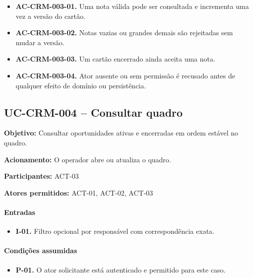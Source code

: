 \documentclass[10pt,a4paper]{article}
\begin{document}
\begin{itemize}

\item \textbf{AC-CRM-003-01.} Uma nota válida pode ser consultada e incrementa uma vez a versão do cartão.

\item \textbf{AC-CRM-003-02.} Notas vazias ou grandes demais são rejeitadas sem mudar a versão.

\item \textbf{AC-CRM-003-03.} Um cartão encerrado ainda aceita uma nota.

\item \textbf{AC-CRM-003-04.} Ator ausente ou sem permissão é recusado antes de qualquer efeito de domínio ou persistência.

\end{itemize}

\subsection{UC-CRM-004 -- Consultar quadro}

\textbf{Objetivo:} Consultar oportunidades ativas e encerradas em ordem estável no quadro.

\textbf{Acionamento:} O operador abre ou atualiza o quadro.

\textbf{Participantes:} ACT-03

\textbf{Atores permitidos:} ACT-01, ACT-02, ACT-03

\paragraph{Entradas}

\begin{itemize}

\item \textbf{I-01.} Filtro opcional por responsável com correspondência exata.

\end{itemize}

\paragraph{Condições assumidas}

\begin{itemize}

\item \textbf{P-01.} O ator solicitante está autenticado e permitido para este caso.

\end{itemize}
\end{document}
